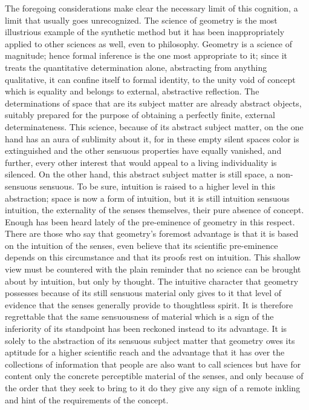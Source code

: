 The foregoing considerations make clear
the necessary limit of this cognition,
a limit that usually goes unrecognized.
The science of geometry is the
most illustrious example of the synthetic method
but it has been inappropriately applied
to other sciences as well, even to philosophy.
Geometry is a science of magnitude;
hence formal inference is the one most appropriate to it;
since it treats the quantitative determination alone,
abstracting from anything qualitative,
it can confine itself to formal identity,
to the unity void of concept which is equality
and belongs to external, abstractive reflection.
The determinations of space that are its
subject matter are already abstract objects,
suitably prepared for the purpose of
obtaining a perfectly finite, external determinateness.
This science, because of its abstract subject matter,
on the one hand has an aura of sublimity about it,
for in these empty silent spaces color is extinguished
and the other sensuous properties have equally vanished,
and further, every other interest that would appeal to
a living individuality is silenced.
On the other hand, this abstract subject matter is
still space, a non-sensuous sensuous.
To be sure, intuition is raised to
a higher level in this abstraction;
space is now a form of intuition,
but it is still intuition
sensuous intuition,
the externality of the senses themselves,
their pure absence of concept.
Enough has been heard lately
of the pre-eminence of geometry in this respect.
There are those who say
that geometry's foremost advantage is
that it is based on the intuition of the senses,
even believe that its scientific pre-eminence
depends on this circumstance
and that its proofs rest on intuition.
This shallow view must be countered with
the plain reminder that no science can be
brought about by intuition, but only by thought.
The intuitive character that geometry possesses
because of its still sensuous material
only gives to it that level of evidence that
the senses generally provide to thoughtless spirit.
It is therefore regrettable that the same sensuousness of material
which is a sign of the inferiority of its standpoint
has been reckoned instead to its advantage.
It is solely to the abstraction of its sensuous subject matter
that geometry owes its aptitude for a higher scientific reach
and the advantage that it has over the collections of information
that people are also want to call sciences
but have for content only the concrete
perceptible material of the senses,
and only because of the order that they seek to bring to it
do they give any sign of a remote inkling and hint of
the requirements of the concept.

